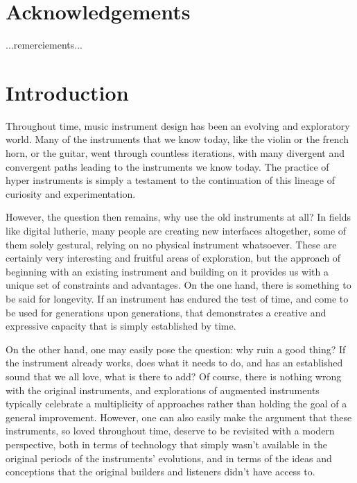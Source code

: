 \documentclass[12pt,twoside,maitrise]{dms}
\theoremstyle{definition}
\begin{document}

\chapter*{Acknowledgements}

...remerciements...


\NoChapterPageNumber
\cleardoublepage


\chapter*{Introduction}

Throughout time, music instrument design has been an evolving and exploratory world.
Many of the instruments that we know today, like the violin or the french horn, or the guitar, went through countless iterations, with many divergent and convergent paths leading to the instruments we know today.
The practice of hyper instruments is simply a testament to the continuation of this lineage of curiosity and experimentation.

However, the question then remains, why use the old instruments at all?
In fields like digital lutherie, many people are creating new interfaces altogether, some of them solely gestural, relying on no physical instrument whatsoever.
These are certainly very interesting and fruitful areas of exploration, but the approach of beginning with an existing instrument and building on it provides us with a unique set of constraints and advantages.
On the one hand, there is something to be said for longevity.
If an instrument has endured the test of time, and come to be used for generations upon generations, that demonstrates a creative and expressive capacity that is simply established by time.

On the other hand, one may easily pose the question: why ruin a good thing?
If the instrument already works, does what it needs to do, and has an established sound that we all love, what is there to add?
Of course, there is nothing wrong with the original instruments, and explorations of augmented instruments typically celebrate a multiplicity of approaches rather than holding the goal of a general improvement.
However, one can also easily make the argument that these instruments, so loved throughout time, deserve to be revisited with a modern perspective, both in terms of technology that simply wasn't available in the original periods of the instruments' evolutions, and in terms of the ideas and conceptions that the original builders and listeners didn't have access to.
\end{document}
